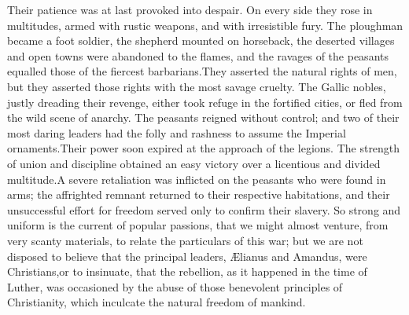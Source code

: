 Their patience was at last provoked into despair. On every side
they rose in multitudes, armed with rustic weapons, and with
irresistible fury. The ploughman became a foot soldier, the
shepherd mounted on horseback, the deserted villages and open
towns were abandoned to the flames, and the ravages of the
peasants equalled those of the fiercest barbarians.\footnotemark[20] They
asserted the natural rights of men, but they asserted those
rights with the most savage cruelty. The Gallic nobles, justly
dreading their revenge, either took refuge in the fortified
cities, or fled from the wild scene of anarchy. The peasants
reigned without control; and two of their most daring leaders had
the folly and rashness to assume the Imperial ornaments.\footnotemark[21] Their
power soon expired at the approach of the legions. The strength
of union and discipline obtained an easy victory over a
licentious and divided multitude.\footnotemark[22] A severe retaliation was
inflicted on the peasants who were found in arms; the affrighted
remnant returned to their respective habitations, and their
unsuccessful effort for freedom served only to confirm their
slavery. So strong and uniform is the current of popular
passions, that we might almost venture, from very scanty
materials, to relate the particulars of this war; but we are not
disposed to believe that the principal leaders, Ælianus and
Amandus, were Christians,\footnotemark[23] or to insinuate, that the rebellion,
as it happened in the time of Luther, was occasioned by the abuse
of those benevolent principles of Christianity, which inculcate
the natural freedom of mankind.





